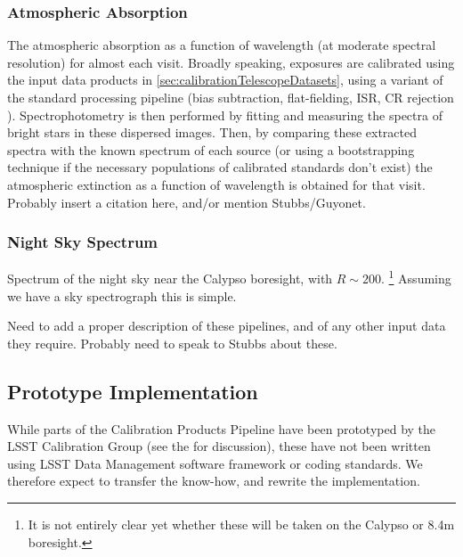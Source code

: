 \subsubsection{Atmospheric Absorption}\label{sec:CPP:output:atmosphericAbsorption}
The atmospheric absorption as a function of wavelength (at moderate spectral resolution) for almost each visit.
\alg Broadly speaking, exposures are calibrated using the input data products in \secsymbol\ref{sec:calibrationTelescopeDatasets}, using a variant of the standard processing pipeline (bias subtraction, flat-fielding, ISR, CR rejection \etc). Spectrophotometry is then performed by fitting and measuring the spectra of bright stars in these dispersed images. Then, by comparing these extracted spectra with the known spectrum of each source (or using a bootstrapping technique if the necessary populations of calibrated standards don't exist) the atmospheric extinction as a function of wavelength is obtained for that visit. \xxx Probably insert a citation here, and/or mention Stubbs/Guyonet.

 
\subsubsection{Night Sky Spectrum}\label{calypso:nightSkySpectrum}
Spectrum of the night sky near the Calypso boresight, with $R \sim 200$. \footnote{It is not entirely clear yet whether these will be taken on the Calypso or 8.4m boresight.}
\alg Assuming we have a sky spectrograph this is simple.

\begin{note}
	Need to add a proper description of these pipelines, and of any other input data they require. Probably need to speak to Stubbs about these.
\end{note}




\subsection{Prototype Implementation}

While parts of the Calibration Products Pipeline have been prototyped by the LSST Calibration Group (see the \NewPCP for discussion), these have not been written using LSST Data Management software framework or coding standards. We therefore expect to transfer the know-how, and rewrite the implementation.











